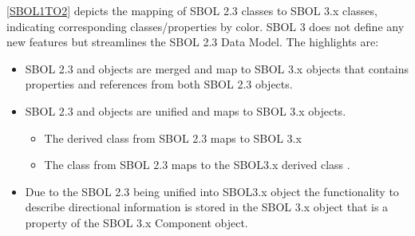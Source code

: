 \ref{SBOL1TO2} depicts the mapping of SBOL 2.3 classes to SBOL 3.x classes, indicating corresponding classes/properties by color.
SBOL 3 does not define any new features but streamlines the SBOL 2.3 Data Model.
The highlights are:
\begin{itemize}
	
	\item SBOL 2.3  and  objects are merged and map to SBOL 3.x  objects that contains properties and references from both SBOL 2.3 objects.
	
	\item SBOL 2.3  and  objects are unified and maps to SBOL 3.x  objects.
	
	\begin{itemize}
		
		\item The derived class from SBOL 2.3  maps to SBOL 3.x 
		\item The class from SBOL 2.3  maps to the SBOL3.x derived class .
	\end{itemize}
	
	\item Due to the SBOL 2.3  being unified into SBOL3.x  object the functionality to describe directional information is stored in the SBOL 3.x  object that is a property of the SBOL 3.x {Component} object.
	
\end{itemize}


